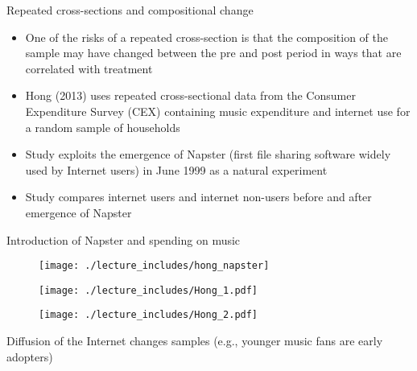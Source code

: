 \documentclass{beamer}
\begin{document}
\begin{frame}{Repeated cross-sections and compositional change}
	
	\begin{itemize}
	\item One of the risks of a repeated cross-section is that the composition of the sample may have changed between the pre and post period in ways that are correlated with treatment
	\item Hong (2013) uses repeated cross-sectional data from the Consumer Expenditure Survey (CEX) containing music expenditure and internet use for a random sample of households
	\item Study exploits the emergence of Napster (first file sharing software widely used by Internet users) in June 1999 as a natural experiment
	\item Study compares internet users and internet non-users before and after emergence of Napster
	\end{itemize}

\end{frame}

\begin{frame}{Introduction of Napster and spending on music}
	\begin{figure}
	\texttt{[image: ./lecture\_includes/hong\_napster]}
	\end{figure}
	
\end{frame}


\begin{frame}[plain]
	\begin{figure}
	\texttt{[image: ./lecture\_includes/Hong\_1.pdf]}
	\end{figure}
	
\end{frame}





\begin{frame}[shrink=20,plain]
	\begin{figure}
	\texttt{[image: ./lecture\_includes/Hong\_2.pdf]}
	\end{figure}
	
	Diffusion of the Internet changes samples (e.g., younger music fans are early adopters)
	
\end{frame}
\end{document}
